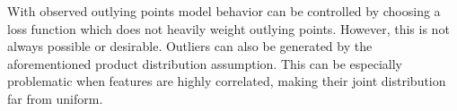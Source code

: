With observed outlying points model behavior can be controlled by choosing a loss function which does not heavily weight outlying points. However, this is not always possible or desirable. Outliers can also be generated by the aforementioned product distribution assumption. This can be especially problematic when features are highly correlated, making their joint distribution far from uniform.







\address{Zachary M. Jones\\
  Pennsylvania State University\\
  University Park, Pennsylvania\\
  United States\\}

